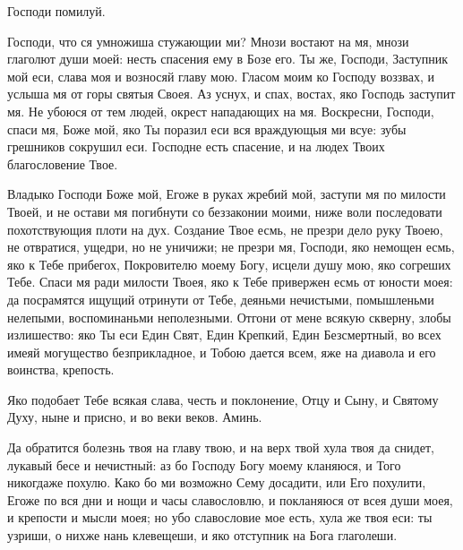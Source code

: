 \begin{mymulticols}

 \TsariuNebesnyj

\TrisviatoePoOtcheNash

Господи помилуй. 

\priiditepoklonimsia



Господи, что ся умножиша стужающии ми? Мнози востают на мя, мнози глаголют души моей: несть спасения ему в Бозе его. Ты же, Господи, Заступник мой еси, слава моя и возносяй главу мою. Гласом моим ко Господу воззвах, и услыша мя от горы святыя Своея. Аз уснух, и спах, востах, яко Господь заступит мя. Не убоюся от тем людей, окрест нападающих на мя. Воскресни, Господи, спаси мя, Боже мой, яко Ты поразил еси вся враждующыя ми всуе: зубы грешников сокрушил еси. Господне есть спасение, и на людех Твоих благословение Твое.




Владыко Господи Боже мой, Егоже в руках жребий мой, заступи мя по милости Твоей, и не остави мя погибнути со беззаконии моими, ниже воли последовати похотствующия плоти на дух. Создание Твое есмь, не презри дело руку Твоею, не отвратися, ущедри, но не уничижи;  не презри мя, Господи, яко немощен есмь, яко к Тебе прибегох, Покровителю моему Богу, исцели душу мою, яко согреших Тебе. Спаси мя ради милости Твоея, яко к Тебе привержен есмь от юности моея: да посрамятся ищущий отринути от Тебе, деяньми нечистыми, помышленьми  нелепыми,  воспоминаньми неполезными. Отгони от мене всякую скверну, злобы излишество: яко Ты еси Един Свят, Един Крепкий, Един Безсмертный, во всех имеяй могущество безприкладное, и Тобою дается всем, яже на диавола и его воинства, крепость.

Яко подобает Тебе всякая слава, честь и поклонение, Отцу и Сыну, и Святому Духу, ныне и присно, и во веки веков. Аминь.




Да обратится болезнь твоя на главу твою, и на верх твой хула твоя да снидет, лукавый бесе и нечистный: аз бо Господу Богу моему кланяюся, и Того никогдаже похулю. Како бо ми возможно Сему досадити, или Его похулити, Егоже по вся дни и нощи и часы славословлю, и покланяюся от всея души моея, и крепости и мысли моея; но убо славословие мое есть, хула же твоя еси: ты узриши, о нихже нань клевещеши, и яко отступник на Бога глаголеши.





\end{mymulticols}
